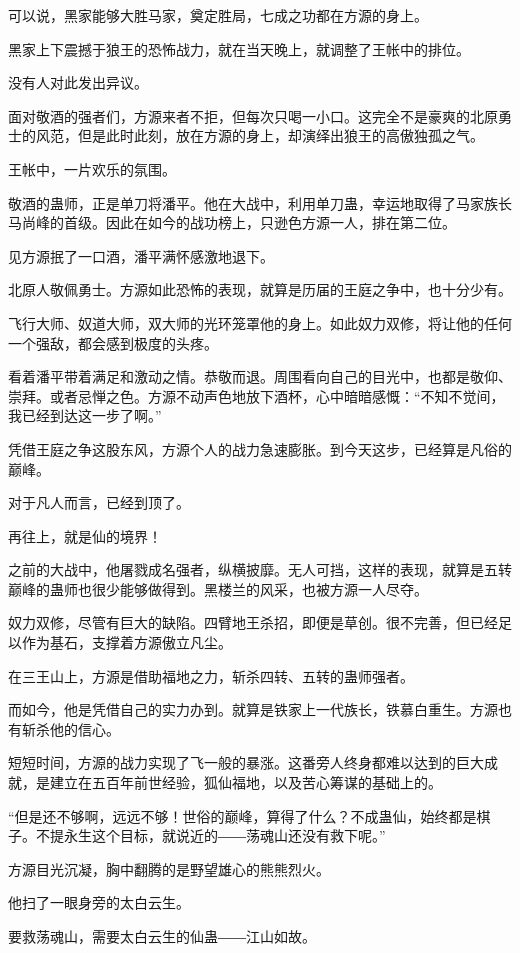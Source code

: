 \begin{this_body}
可以说，黑家能够大胜马家，奠定胜局，七成之功都在方源的身上。

黑家上下震撼于狼王的恐怖战力，就在当天晚上，就调整了王帐中的排位。

没有人对此发出异议。

面对敬酒的强者们，方源来者不拒，但每次只喝一小口。这完全不是豪爽的北原勇士的风范，但是此时此刻，放在方源的身上，却演绎出狼王的高傲独孤之气。

王帐中，一片欢乐的氛围。

敬酒的蛊师，正是单刀将潘平。他在大战中，利用单刀蛊，幸运地取得了马家族长马尚峰的首级。因此在如今的战功榜上，只逊色方源一人，排在第二位。

见方源抿了一口酒，潘平满怀感激地退下。

北原人敬佩勇士。方源如此恐怖的表现，就算是历届的王庭之争中，也十分少有。

飞行大师、奴道大师，双大师的光环笼罩他的身上。如此奴力双修，将让他的任何一个强敌，都会感到极度的头疼。

看着潘平带着满足和激动之情。恭敬而退。周围看向自己的目光中，也都是敬仰、崇拜。或者忌惮之色。方源不动声色地放下酒杯，心中暗暗感慨：“不知不觉间，我已经到达这一步了啊。”

凭借王庭之争这股东风，方源个人的战力急速膨胀。到今天这步，已经算是凡俗的巅峰。

对于凡人而言，已经到顶了。

再往上，就是仙的境界！

之前的大战中，他屠戮成名强者，纵横披靡。无人可挡，这样的表现，就算是五转巅峰的蛊师也很少能够做得到。黑楼兰的风采，也被方源一人尽夺。

奴力双修，尽管有巨大的缺陷。四臂地王杀招，即便是草创。很不完善，但已经足以作为基石，支撑着方源傲立凡尘。

在三王山上，方源是借助福地之力，斩杀四转、五转的蛊师强者。

而如今，他是凭借自己的实力办到。就算是铁家上一代族长，铁慕白重生。方源也有斩杀他的信心。

短短时间，方源的战力实现了飞一般的暴涨。这番旁人终身都难以达到的巨大成就，是建立在五百年前世经验，狐仙福地，以及苦心筹谋的基础上的。

“但是还不够啊，远远不够！世俗的巅峰，算得了什么？不成蛊仙，始终都是棋子。不提永生这个目标，就说近的――荡魂山还没有救下呢。”

方源目光沉凝，胸中翻腾的是野望雄心的熊熊烈火。

他扫了一眼身旁的太白云生。

要救荡魂山，需要太白云生的仙蛊――江山如故。


\end{this_body}
